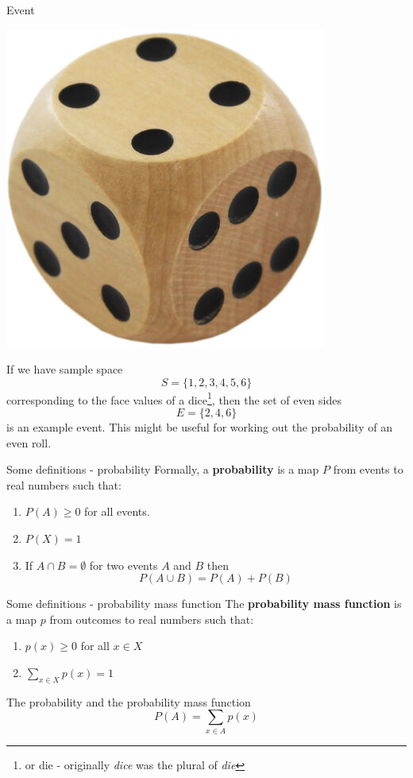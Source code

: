 \documentclass{beamer}
\newcommand{\crish}{\color{reddish}}
\newcommand{\cbla}{\color{black}}
\begin{document}
\begin{frame}{Event}
\begin{center}
    \includegraphics[3cm]{dice.jpg}
\end{center}  
If we have sample space \crish$$S=\{1,2,3,4,5,6\}$$ corresponding to the
face values of a dice\footnote{or die - originally \textsl{dice} was the plural of \textsl{die}}, then the set of even sides \crish$$E=\{2,4,6\}$$\cbla{} is an
example event. This might be useful for working out the probability of an even roll.
\end{frame}

\begin{frame}{Some definitions - probability}
Formally, a \textbf{probability} is a map \crish$P$\cbla{}  from
events to real numbers such that:
\begin{enumerate}
\item \crish$P(A)\ge 0$\cbla{}  for all events.
\item \crish$P(X)=1$\cbla{} 
\item If \crish$A\cap B=\emptyset$\cbla{}  for two events \crish$A$\cbla{}  and \crish$B$\cbla{}  then 
\crish$$
P(A\cup B)=P(A)+P(B)
$$\cbla{}
\end{enumerate}
\end{frame}  

\begin{frame}{Some definitions - probability mass function}
The \textbf{probability mass function} is a map \crish$p$\cbla{}  from outcomes to real numbers such that:
\begin{enumerate}
\item \crish$p(x)\ge 0$\cbla{}  for all \crish$x\in X$\cbla{} 
\item \crish$\sum_{x\in X} p(x)=1$\cbla{} 
\end{enumerate}
\end{frame}

\begin{frame}{The probability and the probability mass function}
\crish$$
P(A)=\sum_{x\in A}p(x)
$$\cbla{}
\end{frame}

  
\end{document}

